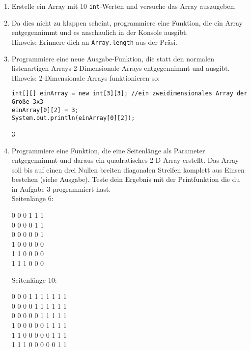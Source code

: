 \documentclass{../../sheet}
\begin{document}
\begin{enumerate}
    \item Erstelle ein Array mit 10 \texttt{int}-Werten und versuche das Array auszugeben.
    \item Da dies nicht zu klappen scheint, programmiere eine Funktion, die ein Array entgegennimmt und es anschaulich in der Konsole ausgibt.\\
          Hinweis: Erinnere dich an \texttt{Array.length} aus der Präsi.
    \item Programmiere eine neue Ausgabe-Funktion, die statt den normalen listenartigen Arrays 2-Dimensionale Arrays entgegennimmt und ausgibt.\\
    Hinweis: 2-Dimensionale Arrays funktionieren so:
    \begin{verbatim}
int[][] einArray = new int[3][3]; //ein zweidimensionales Array der Größe 3x3
einArray[0][2] = 3;
System.out.println(einArray[0][2]);
    \end{verbatim}
    \begin{ausgabe}
        3
    \end{ausgabe}
    \item Programmiere eine Funktion, die eine Seitenlänge als Parameter entgegennimmt und daraus ein quadratisches 2-D Array erstellt. Das Array soll bis auf einen drei Nullen breiten diagonalen Streifen komplett aus Einsen bestehen (siehe Ausgabe). Teste dein Ergebnis mit der Printfunktion die du in Aufgabe 3 programmiert hast.\\
          Seitenlänge 6:
          \begin{ausgabe}
              0 0 0 1 1 1\\
              0 0 0 0 1 1\\
              0 0 0 0 0 1\\
              1 0 0 0 0 0\\
              1 1 0 0 0 0\\
              1 1 1 0 0 0
          \end{ausgabe}
          Seitenlänge 10:
          \begin{ausgabe}
              0 0 0 1 1 1 1 1 1 1 \\
              0 0 0 0 1 1 1 1 1 1 \\
              0 0 0 0 0 1 1 1 1 1 \\
              1 0 0 0 0 0 1 1 1 1 \\
              1 1 0 0 0 0 0 1 1 1 \\
              1 1 1 0 0 0 0 0 1 1 \\

\end{ausgabe}
\end{enumerate}
\end{document}
